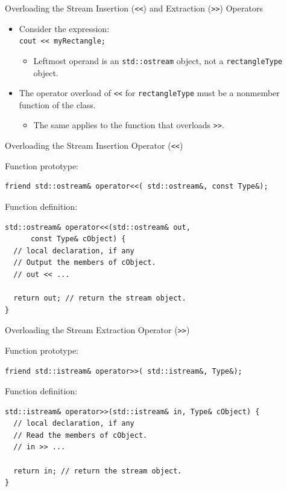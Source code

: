 \documentclass[14pt,aspectratio=1610, hyperref={pdfpagelayout=SinglePage}]{beamer}
\begin{document}
\begin{frame}[fragile]{Overloading the Stream Insertion
(\texttt{{<}<}) and Extraction (\texttt{{>}>}) Operators}
\protect\hypertarget{overloading-the-stream-insertion-and-extraction-operators}{}
\begin{itemize}

\item
  Consider the expression:\\
  \lstinline{cout << myRectangle;}

  \begin{itemize}
  \item
    Leftmost operand is an \lstinline{std::ostream} object, not a
    \lstinline{rectangleType} object.
  \end{itemize}
\item
  The operator overload of
  \lstinline{<<} for \lstinline{rectangleType} must be a
  nonmember function of the class.
  \begin{itemize}
  \item
    The same applies to the function that overloads
    \lstinline{>>}.
    \end{itemize}
\end{itemize}
\end{frame}

\begin{frame}[fragile]{Overloading the Stream Insertion Operator
(\texttt{{<}<})}
\protect\hypertarget{overloading-the-stream-insertion-operator}{}

  Function prototype:
  \begin{lstlisting}
friend std::ostream& operator<<( std::ostream&, const Type&);
\end{lstlisting}

  Function definition:
  \begin{lstlisting}
std::ostream& operator<<(std::ostream& out,
      const Type& cObject) {
  // local declaration, if any
  // Output the members of cObject.
  // out << ...

  return out; // return the stream object.
}\end{lstlisting}

\end{frame}

\begin{frame}[fragile]{Overloading the Stream Extraction Operator
  (\texttt{{>}>})}

  Function prototype:
  \begin{lstlisting}
friend std::istream& operator>>( std::istream&, Type&);
\end{lstlisting}

  Function definition:
  \begin{lstlisting}
std::istream& operator>>(std::istream& in, Type& cObject) {
  // local declaration, if any
  // Read the members of cObject.
  // in >> ...

  return in; // return the stream object.
}\end{lstlisting}

\end{frame}
\end{document}
